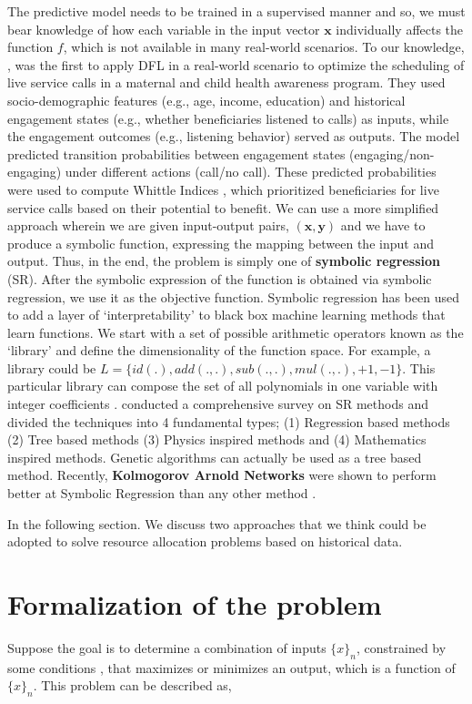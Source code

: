 \documentclass[12pt, letterpaper]{article}
\begin{document}
The predictive model needs to be trained in a supervised manner and so, we must
bear knowledge of how each variable in the input vector $\mathbf{x}$
individually affects the function $f$, which is not available in many real-world
scenarios. To our knowledge, \cite{Google_DFL}, was the first to apply DFL in a
real-world scenario to optimize the scheduling of live service calls in a
maternal and child health awareness program. They used socio-demographic
features (e.g., age, income, education) and historical engagement states (e.g.,
whether beneficiaries listened to calls) as inputs, while the engagement
outcomes (e.g., listening behavior) served as outputs. The model predicted
transition probabilities between engagement states (engaging/non-engaging) under
different actions (call/no call). These predicted probabilities were used to
compute Whittle Indices \cite{P.Whittle}, which prioritized beneficiaries for
live service calls based on their potential to benefit. We can use a more
simplified approach wherein we are given input-output pairs, $\mathbf{(x,y)}$
and we have to produce a symbolic function, expressing the mapping between the
input and output. Thus, in the end, the problem is simply one of
\textbf{symbolic regression} (SR). After the symbolic expression of the function
is obtained via symbolic regression, we use it as the objective function.
Symbolic regression has been used to add a layer of `interpretability' to black
box machine learning methods that learn functions. We start with a set of
possible arithmetic operators known as the `library' and define the
dimensionality of the function space. For example, a library could be $L=\{
id(.), add(.,.), sub(.,.), mul(.,.), +1, -1\}$. This particular library can
compose the set of all polynomials in one variable with integer coefficients
\cite{SR_2024}. \cite{SR_2024} conducted a comprehensive survey on SR methods
and divided the techniques into 4 fundamental types; (1) Regression based
methods (2) Tree based methods (3) Physics inspired methods and (4) Mathematics
inspired methods. Genetic algorithms can actually be used as a tree based
method. Recently, \textbf{Kolmogorov Arnold Networks} were shown to perform
better at Symbolic Regression than any other method \cite{kans_2024}.

In the following section. We discuss two approaches that we think could be adopted
to solve resource allocation problems based on historical data. 

\section{Formalization of the problem}
Suppose the goal is to determine a combination of inputs $\{x\}_n$, constrained
by some conditions , that maximizes or minimizes an output, which is a function
of $\{x\}_n$. This problem can be described as,
\end{document}
